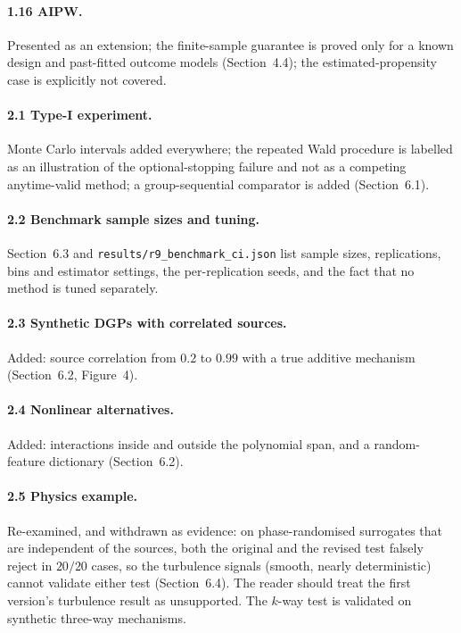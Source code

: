 \documentclass[11pt,a4paper]{article}
\begin{document}
\paragraph{1.16 AIPW.} Presented as an extension; the finite-sample guarantee is proved only for a known design and past-fitted outcome models (Section~4.4); the estimated-propensity case is explicitly not covered.

\paragraph{2.1 Type-I experiment.} Monte Carlo intervals added everywhere; the repeated Wald procedure is labelled as an illustration of the optional-stopping failure and not as a competing anytime-valid method; a group-sequential comparator is added (Section~6.1).

\paragraph{2.2 Benchmark sample sizes and tuning.} Section~6.3 and \texttt{results/r9\_benchmark\_ci.json} list sample sizes, replications, bins and estimator settings, the per-replication seeds, and the fact that no method is tuned separately.

\paragraph{2.3 Synthetic DGPs with correlated sources.} Added: source correlation from $0.2$ to $0.99$ with a true additive mechanism (Section~6.2, Figure~4).

\paragraph{2.4 Nonlinear alternatives.} Added: interactions inside and outside the polynomial span, and a random-feature dictionary (Section~6.2).

\paragraph{2.5 Physics example.} Re-examined, and withdrawn as evidence: on phase-randomised surrogates that are independent of the sources, both the original and the revised test falsely reject in $20/20$ cases, so the turbulence signals (smooth, nearly deterministic) cannot validate either test (Section~6.4). The reader should treat the first version's turbulence result as unsupported. The $k$-way test is validated on synthetic three-way mechanisms.
\end{document}
